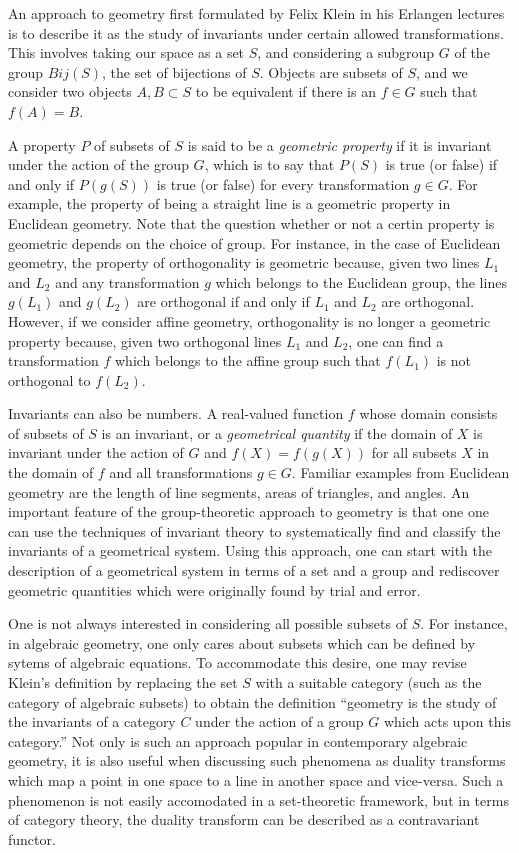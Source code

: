 \documentclass[12pt]{article}
\begin{document}
An approach to geometry first formulated by Felix Klein in his
Erlangen lectures is to describe it as the study of invariants under
certain allowed transformations. This involves taking our space as a
set $S$, and considering a subgroup $G$ of the group $Bij(S)$, the set
of bijections of $S$.  Objects are subsets of $S$, and we consider two
objects $A,B \subset S$ to be equivalent if there is an $f \in G$ such
that $f(A) = B$.

A property $P$ of subsets of $S$ is said to be a \emph{geometric
property} if it is invariant under the action of the group $G$, which
is to say that $P(S)$ is true (or false) if and only if $P(g(S))$ is
true (or false) for every transformation $g \in G$.  For example, the
property of being a straight line is a geometric property in Euclidean
geometry.  Note that the question whether or not a certin property is
geometric depends on the choice of group.  For instance, in the case
of Euclidean geometry, the property of orthogonality is geometric
because, given two lines $L_1$ and $L_2$ and any transformation $g$
which belongs to the Euclidean group, the lines $g(L_1)$ and $g(L_2)$
are orthogonal if and only if $L_1$ and $L_2$ are orthogonal.
However, if we consider affine geometry, orthogonality is no longer a
geometric property because, given two orthogonal lines $L_1$ and
$L_2$, one can find a transformation $f$ which belongs to the affine
group such that $f(L_1)$ is not orthogonal to $f(L_2)$.

Invariants can also be numbers.  A real-valued function $f$ whose
domain consists of subsets of $S$ is an invariant, or a
\emph{geometrical quantity} if the domain of $X$ is invariant under
the action of $G$ and $f(X) = f(g(X))$ for all subsets $X$ in the
domain of $f$ and all transformations $g \in G$.  Familiar examples
from Euclidean geometry are the length of line segments, areas of
triangles, and angles.  An important feature of the group-theoretic
approach to geometry is that one one can use the techniques of
invariant theory to systematically find and classify the invariants of
a geometrical system.  Using this approach, one can start with the
description of a geometrical system in terms of a set and a group and
rediscover geometric quantities which were originally found by trial
and error.

One is not always interested in considering all possible subsets of
$S$.  For instance, in algebraic geometry, one only cares about
subsets which can be defined by sytems of algebraic equations.  To
accommodate this desire, one may revise Klein's definition by
replacing the set $S$ with a suitable category (such as the category
of algebraic subsets) to obtain the definition ``geometry is the study
of the invariants of a category $C$ under the action of a group $G$
which acts upon this category.''  Not only is such an approach popular
in contemporary algebraic geometry, it is also useful when discussing
such phenomena as duality transforms which map a point in one space to
a line in another space and vice-versa.  Such a phenomenon is not
easily accomodated in a set-theoretic framework, but in terms of
category theory, the duality transform can be described as a
contravariant functor.
\end{document}
